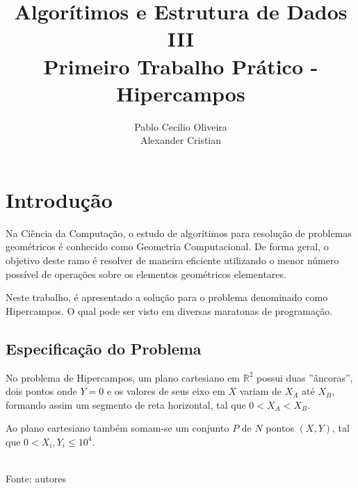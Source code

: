 \documentclass[12pt,a4paper]{article}
\author{Pablo Cecilio Oliveira\\
	Alexander Cristian}
\title{Algorítimos e Estrutura de Dados III\\
	Primeiro Trabalho Prático - Hipercampos}
\date{}
\begin{document}
\maketitle

\section{Introdução}

Na Ciência da Computação, o estudo de algorítimos para resolução de problemas geométricos é conhecido como Geometria Computacional. De forma geral, o objetivo deste ramo é resolver de maneira eficiente utilizando o menor número possível de operações sobre os elementos geométricos elementares.

Neste trabalho, é apresentado a solução para o problema denominado como Hipercampos. O qual pode ser visto em diversas maratonas de programação.

\subsection{Especificação do Problema}

No problema de Hipercampos, um plano cartesiano em $\mathbb{R}^2$ possui duas ''âncoras'', dois pontos onde $Y=0$ e os valores de seus eixo em $X$ variam de $X_A$ até $X_B$, formando assim um segmento de reta horizontal, tal que $0 < X_A < X_B$.

Ao plano cartesiano também somam-se um conjunto $P$ de $N$ pontos $(X,Y)$, tal que $0 < X_i,Y_i \leqslant 10^4$.

\begin{center}
\footnotesize{\\Fonte: autores}
\end{center}
\end{document}
